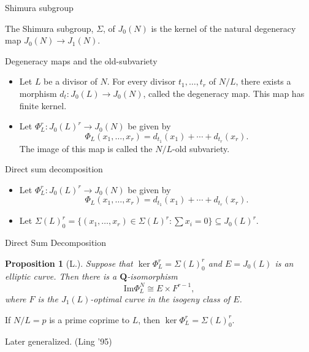 \documentclass{beamer}
\newtheorem{proposition}[theorem]{Proposition}
\newcommand{\QQ}{\mathbf{Q}}
\renewcommand{\Im}{\mathrm{Im}}
\begin{document}
\begin{frame}{Shimura subgroup}
    \begin{definition}
        The Shimura subgroup, $\Sigma$, of $J_0(N)$ is the kernel of the
        natural degeneracy map $J_0(N)\to J_1(N)$.
    \end{definition}
\end{frame}

\begin{frame}{Degeneracy maps and the old-subvariety}
    \begin{itemize}
        \item 
            Let $L$ be a divisor of $N$. For every divisor $t_1,\ldots,t_r$ of
            $N/L$, there exists a morphism $d_t:J_0(L)\to J_0(N)$, called the
            degeneracy map. This map has finite kernel.
        \item
            Let $\Phi_L ^r: J_0(L)^r \to J_0(N)$ be given by
            \[
                \Phi_L(x_1,\ldots,x_r)=d_{t_1}(x_1)+\cdots+d_{t_r}(x_r).
            \]
            The image of this map is called the $N/L$-old subvariety.
    \end{itemize}
\end{frame}

\begin{frame}{Direct sum decomposition}
    \begin{itemize}
        \item 
            Let $\Phi_L ^r: J_0(L)^r \to J_0(N)$ be given by
            \[
                \Phi_L(x_1,\ldots,x_r)=d_{t_1}(x_1)+\cdots+d_{t_r}(x_r).
            \]
        \item
            Let $\Sigma(L)_0 ^r = \{(x_1,\ldots,x_r)\in \Sigma(L)^r: \sum
            x_i=0\}\subseteq J_0(L)^r$.
        \end{itemize}
\end{frame}

\begin{frame}{Direct Sum Decomposition}

    \begin{proposition}[L.]
        Suppose that $\ker\Phi_L ^r = \Sigma(L)_0 ^r$ and $E=J_0(L)$ is an elliptic
        curve. Then there is a $\QQ$-isomorphism
        \[
            \Im\Phi_L ^N \cong E \times F^{r-1},
        \]
        where $F$ is the $J_1(L)$-optimal curve in the isogeny class of $E$.
    \end{proposition}
    \begin{theorem}[Ribet '90]
        If $N/L=p$ is a prime coprime to $L$, then $\ker\Phi_L ^r = \Sigma(L)_0
        ^r$.
    \end{theorem}
    Later generalized. (Ling '95)
\end{frame}
\end{document}
